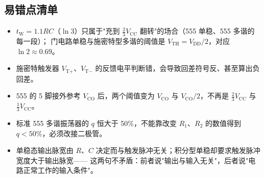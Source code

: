 \subsection{易错点清单}
\begin{itemize}
    \item $t_\text{W}=1.1RC$（$\ln3$）只属于"充到 $\frac{2}{3}V_\text{CC}$ 翻转"的场合（555 单稳、555 多谐的每一段）；
    门电路单稳与施密特型多谐的阈值是 $V_\text{TH}=V_\text{DD}/2$，对应 $\ln2\approx0.69$。
    \item 施密特触发器 $V_{\text{T}+}$、$V_{\text{T}-}$ 的反馈电平判断错，会导致回差符号反、甚至算出负回差。
    \item 555 的 5 脚接外参考 $V_\text{CO}$ 后，两个阈值变为 $V_\text{CO}$ 与 $V_\text{CO}/2$，不再是 $\frac{2}{3}V_\text{CC}$ 与 $\frac{1}{3}V_\text{CC}$。
    \item 标准 555 多谐振荡器的 $q$ 恒大于 50\%，不能靠改变 $R_1$、$R_2$ 的数值得到 $q<50\%$，必须改接二极管。
    \item 单稳态输出脉宽由 $R$、$C$ 决定而与触发脉冲无关；积分型单稳却要求触发脉冲宽度大于输出脉宽——
    这两句不矛盾：前者说"输出与输入无关"，后者说"电路正常工作的输入条件"。
\end{itemize}
